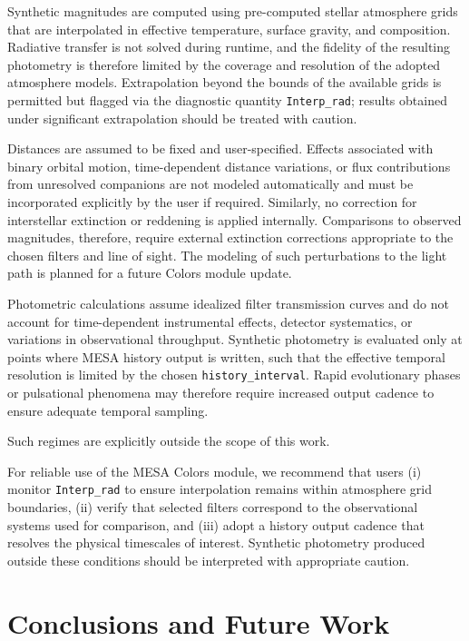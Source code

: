 \documentclass[linenumbers,apj,twocolumn, floatfix]{aastex701} \usepackage{amsmath} \usepackage{longtable} \usepackage{graphicx} \usepackage{ulem} \usepackage{xcolor} \usepackage{lettrine} \usepackage{yfonts} \usepackage{rotating}
\begin{document}
Synthetic magnitudes are computed using pre-computed stellar atmosphere grids that are interpolated in effective temperature, surface gravity, and composition.
Radiative transfer is not solved during runtime, and the fidelity of the resulting photometry is therefore limited by the coverage and resolution of the adopted atmosphere models.
Extrapolation beyond the bounds of the available grids is permitted but flagged via the diagnostic quantity \texttt{Interp\_rad}; results obtained under significant extrapolation should be treated with caution.

Distances are assumed to be fixed and user-specified.
Effects associated with binary orbital motion, time-dependent distance variations, or flux contributions from unresolved companions are not modeled automatically and must be incorporated explicitly by the user if required.
Similarly, no correction for interstellar extinction or reddening is applied internally.
Comparisons to observed magnitudes, therefore, require external extinction corrections appropriate to the chosen filters and line of sight.
The modeling of such perturbations to the light path is planned for a future Colors module update.

Photometric calculations assume idealized filter transmission curves and do not account for time-dependent instrumental effects, detector systematics, or variations in observational throughput.
Synthetic photometry is evaluated only at points where MESA history output is written, such that the effective temporal resolution is limited by the chosen \texttt{history\_interval}.
Rapid evolutionary phases or pulsational phenomena may therefore require increased output cadence to ensure adequate temporal sampling.

Such regimes are explicitly outside the scope of this work.

For reliable use of the MESA Colors module, we recommend that users (i) monitor \texttt{Interp\_rad} to ensure interpolation remains within atmosphere grid boundaries, (ii) verify that selected filters correspond to the observational systems used for comparison, and (iii) adopt a history output cadence that resolves the physical timescales of interest.
Synthetic photometry produced outside these conditions should be interpreted with appropriate caution.

\section{Conclusions and Future Work}
\label{sec:conclusions}
\end{document}
